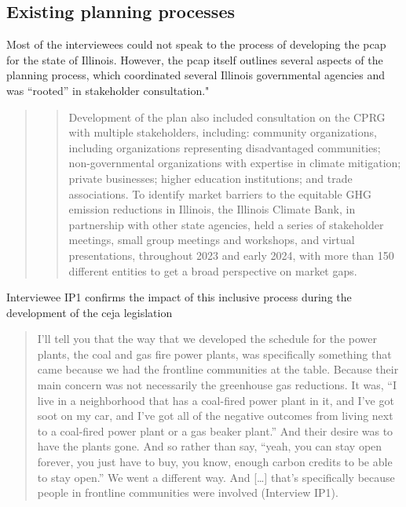 \subsection{Existing planning processes}
Most of the interviewees could not speak to the process of developing the
\acf{pcap} for the state of Illinois. However, the \ac{pcap} itself outlines
several aspects of the planning process, which coordinated several Illinois
governmental agencies and was ``rooted'' in stakeholder consultation."

\begin{quote}
    \blockcquote[10]{kibbey_state_2024}{Development of the plan also included
    consultation on the CPRG with multiple stakeholders, including: community
    organizations, including organizations representing disadvantaged
    communities; non-governmental organizations with expertise in climate
    mitigation; private businesses; higher education institutions; and trade
    associations. To identify market barriers to the equitable GHG emission
    reductions in Illinois, the Illinois Climate Bank, in partnership with other
    state agencies, held a series of stakeholder meetings, small group meetings
    and workshops, and virtual presentations, throughout 2023 and early 2024,
    with more than 150 different entities to get a broad perspective on market
    gaps.}
\end{quote}

Interviewee IP1 confirms the impact of this inclusive process during the
development of the \ac{ceja} legislation
\begin{quote}
     I'll tell you that the way that we developed the schedule for the power
     plants, the coal and gas fire power plants, was specifically something that
     came because we had the frontline communities at the table. Because their
     main concern was not necessarily the greenhouse gas reductions. It was, ``I
     live in a neighborhood that has a coal-fired power plant in it, and I've
     got soot on my car, and I've got all of the negative outcomes from living
     next to a coal-fired power plant or a gas beaker plant.'' And their desire
     was to have the plants gone. And so rather than say, ``yeah, you can stay open
     forever, you just have to buy, you know, enough carbon credits to be able
     to stay open.'' We went a different way. And [\dots] that's specifically
     because people in frontline communities were involved (Interview IP1).
\end{quote}

